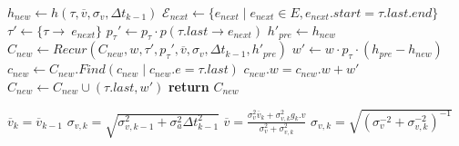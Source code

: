 \begin{algorithm}
{\begin{minipage}{\textwidth}
\begin{algorithmic}[1]
        \State $h_{new}\leftarrow h(\tau,\overline{v},\sigma_v,\Delta t_{k-1})$ 
            \State $\mathcal{E}_{next} \gets \{e_{next}\mid e_{next}\in E, e_{next}.start=\tau.last.end\}$
                \State $\tau'\gets \{\tau\rightarrow\ e_{next}\}$
                \State $p_{\tau}' \gets p_\tau \cdot p(\tau.last\rightarrow e_{next})$ 
                \State $h'_{pre}\gets h_{new}$ 
                \State $C_{new}\gets Recur(C_{new},w,\tau',p_{\tau}',\overline{v},\sigma_v,\Delta t_{k-1}, h'_{pre})$
            \EndFor
        \EndIf 
        \State $w' \gets w\cdot p_{\tau}\cdot (h_{pre}-h_{new})$ 
        \State $c_{new}\gets C_{new}.Find(c_{new}\mid c_{new}.e=\tau .last)$
            \State $c_{new}.w=c_{new}.w+w'$ 
        \Else 
            \State $C_{new}\gets C_{new}\cup (\tau.last, w')$
        \EndIf
        \State \textbf{return} $C_{new}$
    \EndProcedure
        
        \State $\overline{v}_{k}=\overline{v}_{k-1}$ 
        \State $\sigma_{v,k}=\sqrt{\sigma^2_{v,k-1}+ \sigma^2_{a}\Delta t^2_{k-1}}$
        \State $\overline{v} = \frac{\sigma_v^2 \overline{v}_{k}+\sigma^2_{v,k} g_k.v} {\sigma_v^2+\sigma_{v,k}^2}$
        \State $\sigma_{v,k} =\sqrt{(\sigma^{-2}_v + \sigma^{-2}_{v,k})^{-1}}$
    \EndProcedure
\end{algorithmic}
\end{minipage}%
}
\end{algorithm}
